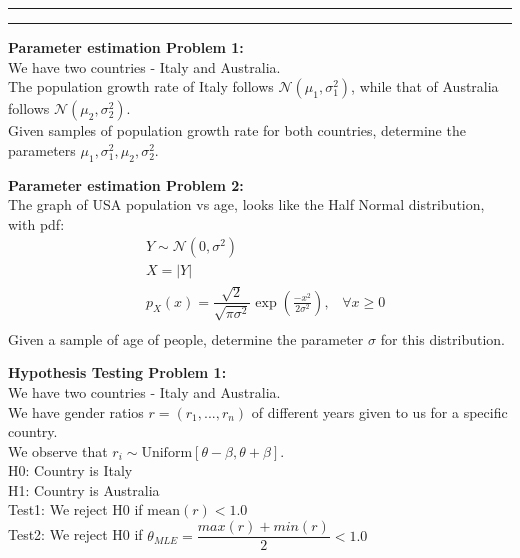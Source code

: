 \documentclass[fleqn, 11pt]{article}
\newcommand{\myline}{
  \par
  \kern3pt %
  \hrule height 0.5pt
  \kern2pt %
  \hrule height 0.5pt
  \kern3pt %
  \par
}
\begin{document}
\vspace{7pt}

\myline


\newpage

\textbf{Parameter estimation Problem 1:} \\
We have two countries - Italy and Australia. \\
The population growth rate of Italy follows $\mathcal{N}(\mu_1, \sigma_1^2)$, while that of Australia follows $\mathcal{N}(\mu_2, \sigma_2^2)$. \\
Given samples of population growth rate for both countries, determine the parameters $\mu_1, \sigma_1^2, \mu_2, \sigma_2^2$. \\

\vspace{15pt}

\textbf{Parameter estimation Problem 2:} \\
The graph of USA population vs age, looks like the Half Normal distribution, with pdf:
\begin{equation*}
     \begin{aligned}
           & Y \sim \mathcal{N}(0, \sigma^2)                                                                                            \\
           & X = |Y|                                                                                                                    \\
           & p_X(x) = \dfrac{\sqrt{2}}{\sqrt{ \pi \sigma^2}} \exp \left(\frac{-x^2}{2 \sigma^2} \right), \hspace{10pt} \forall x \geq 0 \\
     \end{aligned}
\end{equation*}
Given a sample of age of people, determine the parameter $\sigma$ for this distribution. \\

\vspace{15pt}

\textbf{Hypothesis Testing Problem 1:} \\
We have two countries - Italy and Australia. \\
We have gender ratios $r = (r_1, ..., r_n)$ of different years given to us for a specific country. \\
We observe that $r_i \sim \mathrm{Uniform}[\theta-\beta, \theta+\beta]$. \\
H0: Country is Italy \\
H1: Country is Australia \\
Test1: We reject H0 if $\mathrm{mean}(r) < 1.0$ \\
Test2: We reject H0 if $\theta_{MLE} = \dfrac{max(r) + min(r)}{2} < 1.0$ \\
\end{document}
